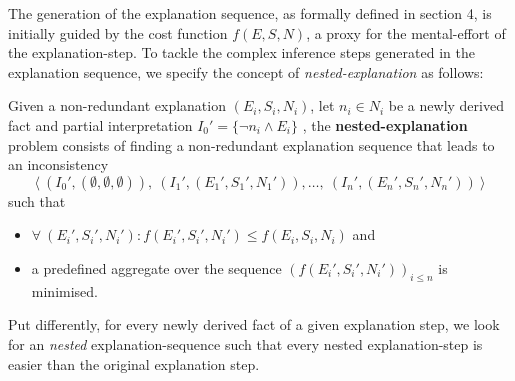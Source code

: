 The generation of the explanation sequence, as formally defined in section 4, is initially guided by the cost function $f(E, S, N)$, a proxy for the mental-effort of the explanation-step. To tackle the complex inference steps generated in the explanation sequence, we specify the concept of \emph{nested-explanation} as follows:

\begin{definition}
    Given a non-redundant explanation $(E_i, S_i, N_i)$, let $n_i \in N_i$ be a newly derived fact and partial interpretation  $I_0' = \{ \neg n_i \wedge E_i \}$ , the \textbf{nested-explanation} problem consists of finding a non-redundant explanation sequence that leads to an inconsistency
    \[\langle \ (I_0',(\emptyset,\emptyset,\emptyset)),\ (I_1',(E_1',S_1',N_1')), \dots ,\ (I_n',(E_n',S_n',N_n')) \ \rangle\]
    such that
    \begin{itemize}
        \item $\forall \ (E_i',S_i',N_i') : f(E_i',S_i',N_i') \leq f(E_i, S_i, N_i)$ and
        \item a predefined aggregate over the sequence $\left(f(E_i',S_i',N_i')\right)_{i\leq n}$ is minimised.
    \end{itemize}
\end{definition}

Put differently, for every newly derived fact of a given explanation step, we look for an \emph{nested} explanation-sequence such that every nested explanation-step is easier than the original explanation step.




